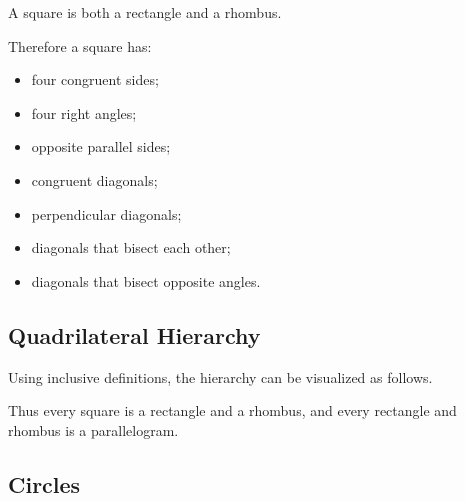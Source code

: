 A square is both a rectangle and a rhombus.

Therefore a square has:

\begin{itemize}
    \item four congruent sides;
    \item four right angles;
    \item opposite parallel sides;
    \item congruent diagonals;
    \item perpendicular diagonals;
    \item diagonals that bisect each other;
    \item diagonals that bisect opposite angles.
\end{itemize}

\subsection{Quadrilateral Hierarchy}
\label{subsec:quadrilateral-hierarchy}

Using inclusive definitions, the hierarchy can be visualized as follows.

\begin{centereddiagram}
\end{centereddiagram}

Thus every square is a rectangle and a rhombus, and every rectangle and
rhombus is a parallelogram.

\subsection{Circles}
\label{subsec:euclidean-circles}

